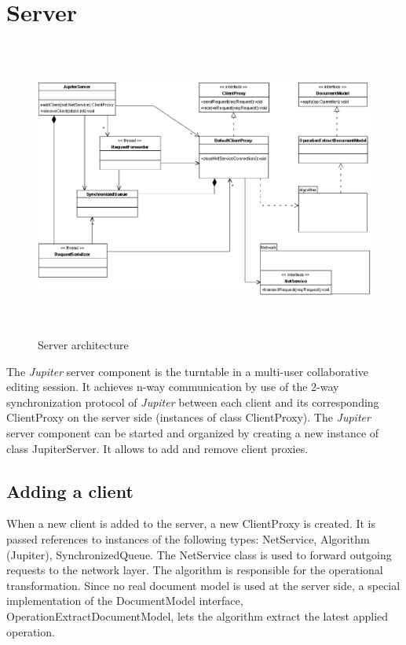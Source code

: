 \section{Server}
\begin{figure}[H]
\centering
\includegraphics[height=9.8cm,width=15.36cm]{../../images/algo-impl/server_diagram.eps}
\caption{Server architecture}
\label{Server architecture}
\end{figure}

The \emph{Jupiter} server component is the turntable in a multi-user collaborative editing session. It achieves n-way communication by use of the 2-way synchronization protocol of \emph{Jupiter} between each client and its corresponding ClientProxy on the server side (instances of class ClientProxy). The \emph{Jupiter} server component can be started and organized by creating a new instance of class JupiterServer. It allows to add and remove client proxies.

\subsection{Adding a client}
When a new client is added to the server, a new ClientProxy is created. It is passed references to instances of the following types: NetService, Algorithm (Jupiter), SynchronizedQueue. The NetService class is used to forward outgoing requests to the network layer. The algorithm is responsible for the operational transformation. Since no real document model is used at the server side, a special implementation of the DocumentModel interface, OperationExtractDocumentModel, lets the algorithm extract the latest applied operation.

